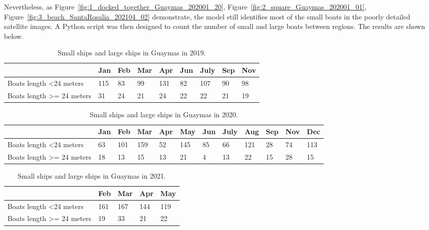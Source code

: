 Nevertheless, as Figure~\ref{fig:1_docked_together_Guaymas_202001_20}, Figure~\ref{fig:2_square_Guaymas_202001_01}, Figure~\ref{fig:3_beach_SantaRosalia_202104_02} demonstrate, the model still identifies most of the small boats in the poorly detailed satellite images. A Python script was then designed to count the number of small and large boats between regions. The results are shown below.


\begin{table}[h!]
\begin{tabular}{|l|l|l|l|l|l|l|l|l|}
\hline
                                       & Jan & Feb & Mar & Apr & Jun & July & Sep & Nov \\ \hline
Boats length \textless 24 meters       & 115 & 83  & 99  & 131 & 82  & 107  & 90  & 98  \\ \hline
Boats length \textgreater{}= 24 meters & 31  & 24  & 21  & 24  & 22  & 22   & 21  & 19  \\ \hline
\end{tabular}
\caption{Small ships and large ships in Guaymas in 2019.}
\end{table}




\begin{table}[h!]
\begin{tabular}{|l|l|l|l|l|l|l|l|l|l|l|l|}
\hline
                                       & Jan & Feb & Mar & Apr & May & Jun & July & Aug & Sep & Nov & Dec \\ \hline
Boats length \textless 24 meters       & 63  & 101 & 159 & 52  & 145 & 85  & 66   & 121 & 28  & 74  & 113 \\ \hline
Boats length \textgreater{}= 24 meters & 18  & 13  & 15  & 13  & 21  & 4   & 13   & 22  & 15  & 28  & 15  \\ \hline
\end{tabular}
\caption{Small ships and large ships in Guaymas in 2020.}
\end{table}



\begin{table}[h!]
\begin{tabular}{|l|l|l|l|l|}
\hline
                                       & Feb & Mar & Apr & May \\ \hline
Boats length \textless 24 meters       & 161 & 167 & 144 & 119 \\ \hline
Boats length \textgreater{}= 24 meters & 19  & 33  & 21  & 22  \\ \hline
\end{tabular}
\caption{Small ships and large ships in Guaymas in 2021.}
\end{table}



